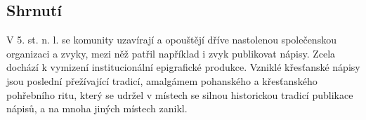 
\subsection[shrnutí-23]{Shrnutí}

V 5. st. n. l. se komunity uzavírají a opouštějí dříve nastolenou společenskou organizaci a zvyky, mezi něž patřil například i zvyk publikovat nápisy. Zcela dochází k vymizení institucionální epigrafické produkce. Vzniklé křesťanské nápisy jsou poslední přežívající tradicí, amalgámem pohanského a křesťanského pohřebního ritu, který se udržel v místech se silnou historickou tradicí publikace nápisů, a na mnoha jiných místech zanikl.


